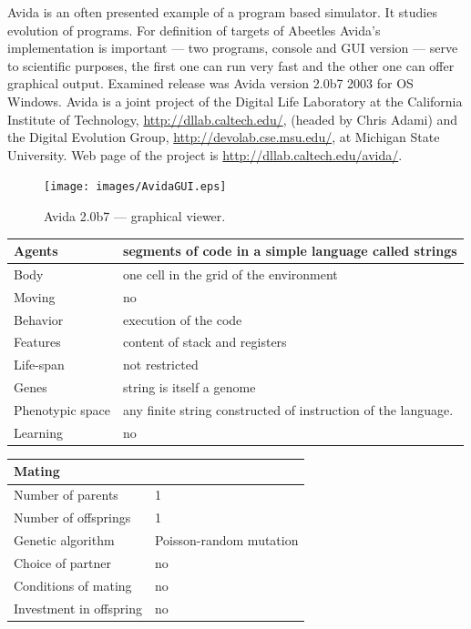 \documentclass[a4paper,12pt]{report}
\begin{document}
Avida is an often presented example of a program based simulator. It studies evolution of programs. For definition of targets of Abeetles Avida's implementation is important  --- two programs, console and GUI version --- serve to scientific purposes, the first one can run very fast and the other one can offer graphical output. Examined release was Avida version 2.0b7 2003 for OS Windows. Avida is a joint project of the Digital Life Laboratory at the California Institute of Technology, \url{http://dllab.caltech.edu/}, (headed by Chris Adami) and the Digital Evolution Group, \url{http://devolab.cse.msu.edu/}, at Michigan State University. Web page of the project is \url{http://dllab.caltech.edu/avida/}.

\begin{figure}
\begin{center}
  \texttt{[image: images/AvidaGUI.eps]}
  \caption{Avida 2.0b7 --- graphical viewer.}
  \label{img.Avida}
\end{center}
\end{figure}

\vspace{20pt}

\begin{tabular}{|p{150pt}|p{220pt}|}
\hline
\textbf{Agents}&segments of code in a simple language called strings  \\ \hline
Body&one cell in the grid of the environment \\ \hline
Moving&no \\ \hline
Behavior&execution of the code \\ \hline
Features&content of stack and registers \\ \hline
Life-span&not restricted \\ \hline
Genes&string is itself a genome \\ \hline
Phenotypic space&any finite string constructed of instruction of the language. \\ \hline
Learning&no \\ \hline 
\end{tabular}
 
\vspace{10pt}
\begin{tabular}{|p{150pt}|p{220pt}|} 
\hline \textbf{Mating}& \\ \hline
Number of parents&1 \\ \hline
Number of offsprings&1 \\ \hline
Genetic algorithm&Poisson-random mutation \\ \hline
Choice of partner&no \\ \hline
Conditions of mating&no \\ \hline
Investment in offspring&no \\ \hline 
\end{tabular} 
\end{document}
